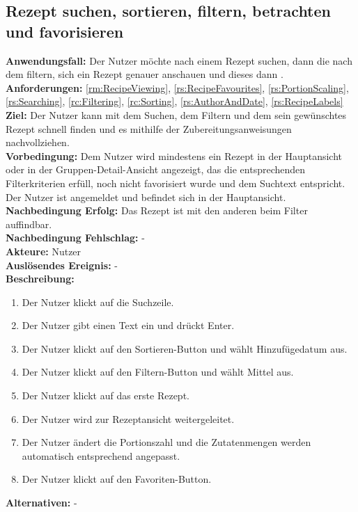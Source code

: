 \documentclass[parskip=full]{scrartcl}
\begin{document}
\subsection{Rezept suchen, sortieren, filtern, betrachten und favorisieren}
\textbf{Anwendungsfall:} Der Nutzer möchte nach einem Rezept suchen, dann die  nach dem  filtern, sich ein Rezept genauer anschauen und dieses dann .\\
\textbf{Anforderungen:} \ref{rm:RecipeViewing}, \ref{rs:RecipeFavourites}, \ref{rs:PortionScaling}, \ref{rs:Searching}, \ref{rc:Filtering}, \ref{rc:Sorting}, \ref{rs:AuthorAndDate}, \ref{rs:RecipeLabels}\\
\textbf{Ziel:} Der Nutzer kann mit dem Suchen, dem Filtern und dem  sein gewünschtes Rezept schnell finden und es mithilfe der Zubereitungsanweisungen nachvollziehen.\\
\textbf{Vorbedingung:} Dem Nutzer wird mindestens ein Rezept in der Hauptansicht oder in der Gruppen-Detail-Ansicht angezeigt, das die entsprechenden Filterkriterien erfüll, noch nicht favorisiert wurde und dem Suchtext entspricht. Der Nutzer ist angemeldet und befindet sich in der Hauptansicht.\\
\textbf{Nachbedingung Erfolg:} Das  Rezept ist mit den anderen   beim Filter   auffindbar.\\
\textbf{Nachbedingung Fehlschlag:} -\\
\textbf{Akteure:} Nutzer\\
\textbf{Auslösendes Ereignis:} -\\
\textbf{Beschreibung:}
\begin{enumerate}
    \item Der Nutzer klickt auf die Suchzeile.
    \item Der Nutzer gibt einen Text ein und drückt Enter.
    \item Der Nutzer klickt auf den Sortieren-Button und wählt Hinzufügedatum aus.
    \item Der Nutzer klickt auf den Filtern-Button und wählt  Mittel aus.
    \item Der Nutzer klickt auf das erste Rezept.
    \item Der Nutzer wird zur Rezeptansicht weitergeleitet.
    \item Der Nutzer ändert die Portionszahl und die Zutatenmengen werden automatisch entsprechend angepasst.
    \item Der Nutzer klickt auf den Favoriten-Button.
\end{enumerate}
\textbf{Alternativen:} -
\newpage
\end{document}

